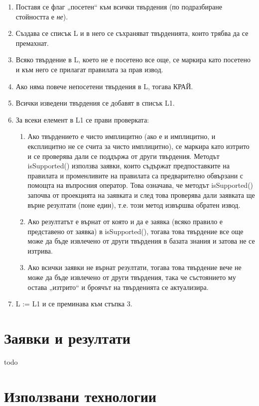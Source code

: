 \documentclass[12pt]{article}
\begin{document}
    \begin{enumerate}
        \item Поставя се флаг „посетен“ към всички твърдения (по подразбиране стойността е \textit{не}).
        \item Създава се списък L и в него се съхраняват твърденията, които трябва да се премахнат.
        \item Всяко твърдение в L, което не е посетено все още, се маркира като посетено и към него се прилагат правилата за прав извод.
        \item Ако няма повече непосетени твърдения в L, тогава КРАЙ.
        \item Всички изведени твърдения се добавят в списък L1.
        \item За всеки елемент в L1 се прави проверката:
            \begin{enumerate}
                \item Ако твърдението е чисто имплицитно (ако е и имплицитно, и експлицитно не се счита за чисто имплицитно), се маркира като изтрито и се проверява дали се поддържа от други твърдения. Методът isSupported() използва заявки, които съдържат предпоставките на правилата и променливите на правилата са предварително обвързани с помощта на въпросния оператор. Това означава, че методът isSupported() започва от проекцията на заявката и след това проверява дали заявката ще върне резултати (поне един), т.е. този метод извършва обратен извод.
                \item Ако резултатът е върнат от която и да е заявка (всяко правило е представено от заявка) в isSupported(), тогава това твърдение все още може да бъде извлечено от други твърдения в базата знания и затова не се изтрива.
                \item Ако всички заявки не върнат резултати, тогава това твърдение вече не може да бъде извлечено от други твърдения, така че състоянието му остава „изтрито“ и броячът на твърденията се актуализира.
            \end{enumerate}
        \item L := L1 и се преминава към стъпка 3.
    \end{enumerate}

\section{Заявки и резултати}

todo

\section{Използвани технологии}
\end{document}
